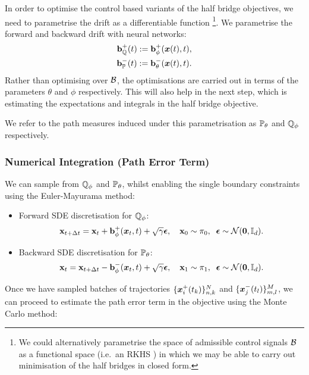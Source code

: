 \documentclass[a4paper,12pt,twoside,openright]{report}
\theoremstyle{definition}
\begin{document}
In order to optimise the control based variants of the half bridge objectives, we need to parametrise the drift as a differentiable function \footnote{We could alternatively parametrise the space of admissible control signals $\calB$ as a functional space (i.e.\ an  RKHS \citep{alvarezkernel}) in which we may be able to carry out minimisation of the half bridges in closed form.}. We parametrise the forward and backward drift with neural networks:
\begin{align} \label{eq:drift_param}
    \rvb^{+}_{\Q}(t) := \rvb^{+}_{\phi}(\vx(t), t), \nonumber \\
    \rvb^{-}_{\P}(t) := \rvb^{-}_{\theta}(\vx(t), t).
\end{align}
Rather than optimising over $\calB$, the optimisations are carried out in terms of the parameters $\theta$ and $\phi$ respectively. This will also help in the next step, which is estimating the expectations and integrals in the half bridge objective.

We refer to the path measures induced under this parametrisation as $\P_{\theta}$ and $\Q_{\phi}$ respectively.

\subsubsection{Numerical Integration (Path Error Term)}
We can sample from $\Q_{\phi}$ and $\P_{\theta}$, whilst enabling the single boundary constraints using the Euler-Mayurama method:
\begin{itemize}
    \item  Forward SDE discretisation for $\Q_{\phi}$:
\begin{align*}
    \rvx_{t + \Delta t} = \rvx_t + \rvb^{+}_{\phi}(\vx_t, t) + \sqrt{\gamma} \rvepsilon, \quad \rvx_0 \sim \pi_0, \;\;\rvepsilon \sim \calN(\vzero, \I).
\end{align*}
    \item  Backward SDE discretisation for $\P_{\theta}$:
\begin{align*}
    \rvx_{t} = \rvx_{t+\Delta t} - \rvb^{-}_{\phi}(\vx_t, t) + \sqrt{\gamma} \rvepsilon, \quad \rvx_1 \sim \pi_1,\;\; \rvepsilon \sim \calN(\vzero, \I).
\end{align*}
\end{itemize}

Once we have sampled batches of trajectories $\{\vx^{+}_i(t_k)\}_{n,k}^N$ and $\{\vx^{-}_j(t_l)\}_{m,l}^M$, we can proceed to estimate the path error term in the objective using the Monte Carlo  method:
\end{document}
